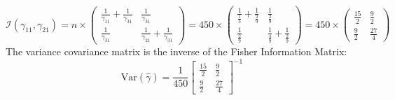 \documentclass[12pt]{article}
\begin{document}
\begin{flushleft}
\[
\mathcal{I}(\gamma_{11}, \gamma_{21}) = n \times
\begin{pmatrix}
\frac{1}{\gamma_{11}} + \frac{1}{\gamma_{31}} & \frac{1}{\gamma_{31}} \\
\frac{1}{\gamma_{31}} & \frac{1}{\gamma_{21}} + \frac{1}{\gamma_{31}}
\end{pmatrix}
=450 \times \begin{pmatrix}
    \frac{1}{\frac{1}{3}}+\frac{1}{\frac{2}{9}} & \frac{1}{\frac{2}{9}} \\
    \frac{1}{\frac{2}{9}} & \frac{1}{\frac{4}{9}}+\frac{1}{\frac{2}{9}}
\end{pmatrix}
=450 \times \begin{pmatrix}
    \frac{15}{2} & \frac{9}{2} \\
    \frac{9}{2} & \frac{27}{4}
\end{pmatrix}
\]
The variance covariance matrix is the inverse of the Fisher Information Matrix:
\[
\text{Var}(\hat{\gamma}) = \frac{1}{450} \begin{bmatrix}
    \frac{15}{2} & \frac{9}{2} \\
    \frac{9}{2} & \frac{27}{4}
\end{bmatrix}^{-1}
\]
\end{flushleft}
\end{document}
